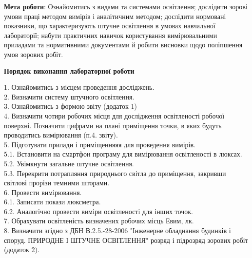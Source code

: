 \documentclass[a4paper,14pt]{extreport}
\begin{document}
\textbf{Мета роботи}: Ознайомитись з видами та системами освітлення; дослідити зорові умови праці методом вимірів і аналітичним методом; дослідити нормовані показники, що характеризують штучне освітлення в умовах навчальної лабораторії; набути практичних навичок користування вимірювальними приладами та нормативними документами й робити висновки щодо поліпшення умов зорових робіт.\\



\begin{center}\textbf{Порядок виконання лабораторної роботи}\end{center}
\par
1. Ознайомитись з місцем проведення досліджень.\\

2. Визначити систему штучного освітлення.\\

3. Ознайомитись з формою звіту (додаток 1)\\

4. Визначити чотири робочих місця для дослідження освітленості робочої поверхні. Позначити цифрами на плані приміщення точки, в яких будуть проводитись вимірювання (п.4. звіту).\\

5. Підготувати прилади і приміщенняяя для проведення вимірів.\\

5.1. Встановити на смартфон програму для вимірювання освітленості в люксах.\\

5.2. Увімкнути загальне штучне освітлення.\\

5.3. Перекрити потрапляння природнього світла до приміщення, закривши світлові прорізи темними шторами.\\

6. Провести вимірювання.\\

6.1. Записати покази люксметра.\\

6.2. Аналогічно провести виміри освітленості для інших точок.\\

7. Обрахувати освітленість визначених робочих місць Евим, лк.\\

8. Визначити згідно з ДБН В.2.5.-28-2006 "Інженерне обладнання будинків і споруд. ПРИРОДНЕ І ШТУЧНЕ ОСВІТЛЕННЯ"  розряд і підрозряд зорових робіт (додаток 2).\\
\end{document}
